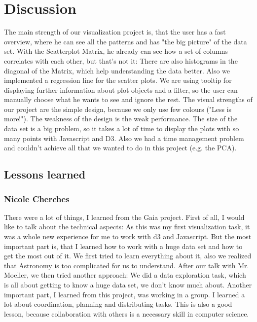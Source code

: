 \documentclass{vgtc}                          %
\begin{document}
\section{Discussion}
The main strength of our visualization project is, that the user has a fast overview, where he can see all the patterns and has "the big picture" of the data set. With the Scatterplot Matrix, he already can see how a set of columns correlates with each other, but that's not it: There are also histograms in the diagonal of the Matrix, which help understanding the data better. Also we implemented a regression line for the scatter plots. We are using tooltip for displaying further information about plot objects and a filter, so the user can manually choose what he wants to see and ignore the rest. The visual strengths of our project are the simple design, because we only use few colours ("Less is more!"). 
The weakness of the design is the weak performance. The size of the data set is a big problem, so it takes a lot of time to display the plots with so many points with Javascript and D3. Also we had a time management problem and couldn't achieve all that we wanted to do in this project (e.g. the PCA). 
\subsection{Lessons learned}
\subsubsection{Nicole Cherches}
There were a lot of things, I learned from the Gaia project. First of all, I would like to talk about the technical aspects: As this was my first visualization task, it was a whole new experience for me to work with d3 and Javascript. But the most important part is, that I learned how to work with a huge data set and how to get the most out of it. We first tried to learn everything about it, also we realized that Astronomy is too complicated for us to understand. After our talk with Mr. Moeller, we then tried another approach: We did a data exploration task, which is all about getting to know a huge data set, we don't know much about.  
Another important part, I learned from this project, was working in a group. I learned a lot about coordination, planning and distributing tasks. This is also a good lesson, because collaboration with others is a necessary skill in computer science.
\end{document}
